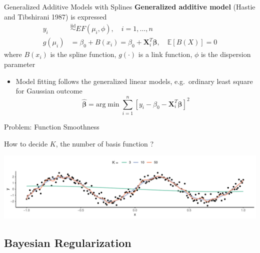 \documentclass[
  ignorenonframetext,
  aspectratio=169]{beamer}
\providecommand{\tightlist}{%
  \setlength{\itemsep}{0pt}\setlength{\parskip}{0pt}}
\newcommand{\bs}[1]{\boldsymbol{#1}}
\newcommand{\simiid}{\overset{\text{iid}}{\sim}}
\begin{document}
\begin{frame}{Generalized Additive Models with Splines}
\protect\hypertarget{generalized-additive-models-with-splines}{}
\textbf{Generalized additive model} (Hastie and Tibshirani 1987) is
expressed \begin{align*}
  y_i &\simiid EF(\mu_i, \phi), \quad i = 1, \dots, n\\
  g(\mu_i) &= \beta_0 + B(x_i) = \beta_0 + \bs X_i^T \bs \beta ,  \quad \mathbb{E}\left[B(X)\right] = 0 
\end{align*} where \(B(x_i)\) is the spline function, \(g(\cdot)\) is a
link function, \(\phi\) is the dispersion parameter

\vspace*{0.2cm}

\begin{itemize}
\tightlist
\item
  Model fitting follows the generalized linear models, e.g.~ordinary
  least square for Gaussian outcome \[
  \boldsymbol{\hat \beta} = \text{arg}\min \sum\limits^n_{i=1} \left[y_i - \beta_0 - \bs X_i^T \bs \beta \right]^2
  \]
\end{itemize}
\end{frame}

\begin{frame}{Problem: Function Smoothness}
\protect\hypertarget{problem-function-smoothness}{}
\begin{tcolorbox}[colback=green!5,colframe=green!40!black,title=Question]
How to decide $K$, the number of basis function ?
\end{tcolorbox}

\includegraphics{phd_defense_slides_files/figure-beamer/spline_overfitting-1.pdf}
\end{frame}

\hypertarget{bayesian-regularization}{%
\subsection{Bayesian Regularization}\label{bayesian-regularization}}
\end{document}
